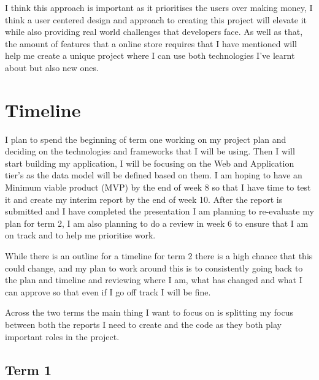 \documentclass[]{project_report}
\begin{document}
I think this approach is important as it prioritises the users over making money, I think a user centered design and approach to creating this project will elevate it while also providing real world challenges that developers face. As well as that, the amount of features that a online store requires that I have mentioned will help me create a unique project where I can use both technologies I've learnt about but also new ones.

\newpage

\chapter{Timeline}


I plan to spend the beginning of term one working on my project plan and deciding on the technologies and frameworks that I will be using. Then I will start building my application, I will be focusing on the Web and Application tier's as the data model will be defined based on them. I am hoping to have an Minimum viable product (MVP) by the end of week 8 so that I have time to test it and create my interim report by the end of week 10. After the report is submitted and I have completed the presentation I am planning to re-evaluate my plan for term 2, I am also planning to do a review in week 6 to ensure that I am on track and to help me prioritise work.

While there is an outline for a timeline for term 2 there is a high chance that this could change, and my plan to work around this is to consistently going back to the plan and timeline and reviewing where I am, what has changed and what I can approve so that even if I go off track I will be fine.


Across the two terms the main thing I want to focus on is splitting my focus between both the reports I need to create and the code as they both play important roles in the project.

\section{Term 1}
\end{document}
